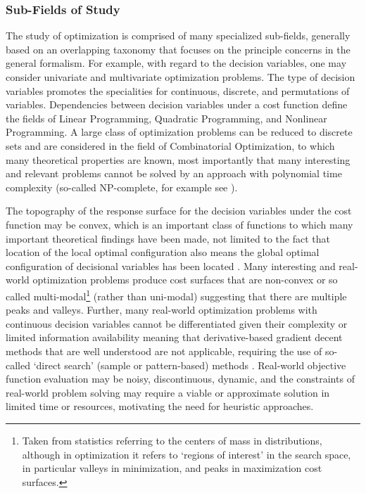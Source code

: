\documentclass[a4paper, 11pt]{article}
\begin{document}
%
%
\subsubsection{Sub-Fields of Study}
The study of optimization is comprised of many specialized sub-fields, generally based on an overlapping taxonomy that focuses on the principle concerns in the general formalism. 
For example, with regard to the decision variables, one may consider univariate and multivariate optimization problems. The type of decision variables promotes the specialities for continuous, discrete, and permutations of variables. Dependencies between decision variables under a cost function define the fields of Linear Programming, Quadratic Programming, and Nonlinear Programming. A large class of optimization problems can be reduced to discrete sets and are considered in the field of Combinatorial Optimization, to which many theoretical properties are known, most importantly that many interesting and relevant problems cannot be solved by an approach with polynomial time complexity (so-called NP-complete, for example see \cite{Papadimitriou1998}).

The topography of the response surface for the decision variables under the cost function may be convex, which is an important class of functions to which many important theoretical findings have been made, not limited to the fact that location of the local optimal configuration also means the global optimal configuration of decisional variables has been located \cite{Boyd2004}. Many interesting and real-world optimization problems produce cost surfaces that are non-convex or so called multi-modal\footnote{Taken from statistics referring to the centers of mass in distributions, although in optimization it refers to `regions of interest' in the search space, in particular valleys in minimization, and peaks in maximization cost surfaces.} (rather than uni-modal) suggesting that there are multiple peaks and valleys. Further, many real-world optimization problems with continuous decision variables cannot be differentiated given their complexity or limited information availability meaning that derivative-based gradient decent methods that are well understood are not applicable, requiring the use of so-called `direct search' (sample or pattern-based) methods \cite{Lewis2000}. Real-world objective function evaluation may be noisy, discontinuous, dynamic, and the constraints of real-world problem solving may require a viable or approximate solution in limited time or resources, motivating the need for heuristic approaches.
\end{document}

